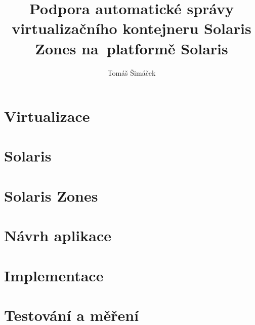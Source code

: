 \documentclass[thesis=M,czech]{FITthesis}[2012/06/26]
\title{Podpora automatické správy virtualizačního kontejneru Solaris Zones na~platformě Solaris}
\author{Tomáš Šimáček} %
\begin{document}

\begin{introduction}
  
\end{introduction}

\chapter{Virtualizace}
  \label{chapter:virtualization}
  
  
\chapter{Solaris}
  \label{chapter:solaris}
  

\chapter{Solaris Zones}
  \label{chapter:zones}
  
  
\chapter{Návrh aplikace}
  \label{chapter:design}
  
  
\chapter{Implementace}
  \label{chapter:implementation}
  
  
\chapter{Testování a měření}
  \label{chapter:testing}
  

\begin{conclusion}
  
\end{conclusion}




\appendix
\end{document}

